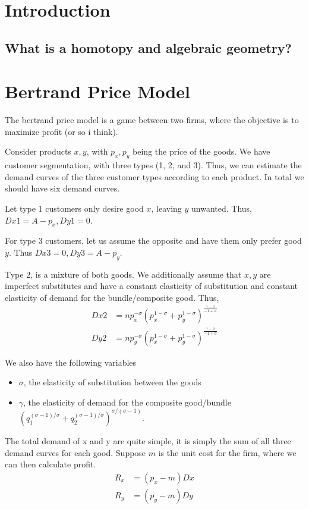 
\section{Introduction}

\subsection{What is a homotopy and algebraic geometry?}


\section{Bertrand Price Model}
The bertrand price model is a game between two firms, where the objective is to maximize profit (or so i think).

Consider products $x, y$, with $p_x, p_y$ being the price of the goods. We have customer segmentation, with three types (1, 2, and 3). Thus, we can estimate the demand curves of the three customer types according to each product. In total we should have six demand curves.

Let type 1 customers only desire good $x$, leaving $y$ unwanted. Thus, $Dx1 = A - p_x, Dy1 = 0$. 

For type 3 customers, let us assume the opposite and have them only prefer good $y$. Thus $Dx3 = 0, Dy3 = A - p_y$.

Type 2, is a mixture of both goods. We additionally assume that $x, y$ are imperfect substitutes and have a constant elasticity of substitution and constant elasticity of demand for the bundle/composite good. Thus,
\begin{align}
    Dx2 &= np_x^{-\sigma}(p_x^{1-\sigma} + p_y^{1-\sigma})^{\frac{\gamma - \sigma}{-1 + \sigma}} \\
    Dy2 &= np_y^{-\sigma}(p_x^{1-\sigma} + p_y^{1-\sigma})^{\frac{\gamma - \sigma}{-1 + \sigma}}
\end{align}

    We also have the following variables
\begin{itemize}
    \item $\sigma$, the elasticity of substitution between the goods
    \item $\gamma$, the elasticity of demand for the composite good/bundle $(q_1^{(\sigma-1)/\sigma} + q_2^{(\sigma-1)/\sigma})^{\sigma/(\sigma - 1)}$.
\end{itemize}


The total demand of x and y are quite simple, it is simply the sum of all three demand curves for each good. Suppose $m$ is the unit cost for the firm, where we can then calculate profit.
\begin{align*}
    R_x  &= (p_x -m)Dx \\
    R_y &= (p_y - m)Dy
\end{align*}

